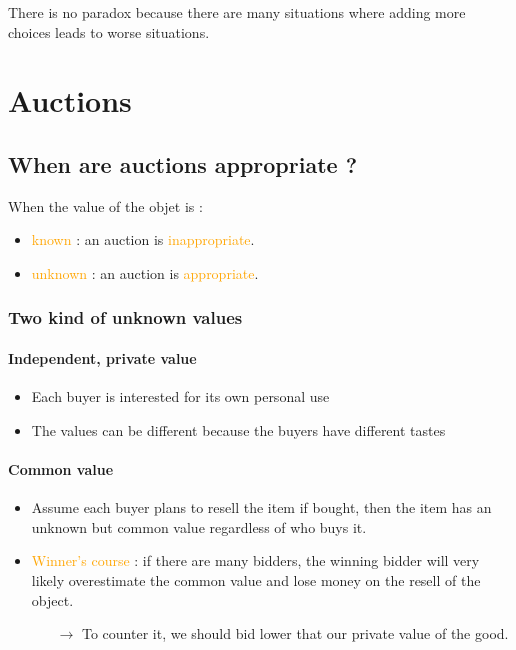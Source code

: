 There is no paradox because there are many situations where adding more choices leads to worse situations.

\chapter{Auctions}

\section{When are auctions appropriate ?}

When the value of the objet is :
\begin{itemize}
\item \textcolor{orange}{known} : an auction is \textcolor{orange}{inappropriate}.
\item \textcolor{orange}{unknown} : an auction is \textcolor{orange}{appropriate}.
\end{itemize}

\subsection{Two kind of unknown values}

\subsubsection{Independent, private value}

\begin{itemize}
\item Each buyer is interested for its own personal use
\item The values can be different because the buyers have different tastes
\end{itemize}

\subsubsection{Common value}

\begin{itemize}
\item Assume each buyer plans to resell the item if bought, then the item has an unknown but common value regardless of who buys it.
\item \textcolor{orange}{Winner's course} : if there are many bidders, the winning bidder will very likely overestimate the common value and lose money on the resell of the object.
	\begin{itemize}
	\item[$\rightarrow$] To counter it, we should bid lower that our private value of the good.
	\end{itemize}
\end{itemize}

